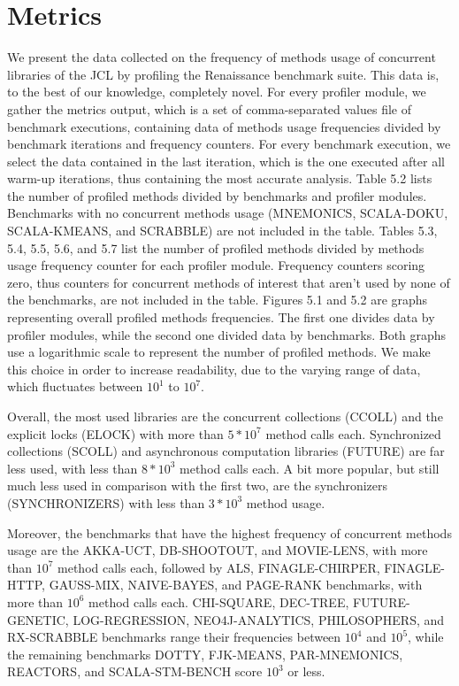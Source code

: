 \documentclass[]{usiinfthesis}
\begin{document}
\section{Metrics}
We present the data collected on the frequency of methods usage of concurrent libraries of the JCL by profiling the Renaissance benchmark suite. This data is, to the best of our knowledge, completely novel. For every profiler module, we gather the metrics output, which is a set of comma-separated values file of benchmark executions, containing data of methods usage frequencies divided by benchmark iterations and frequency counters. For every benchmark execution, we select the data contained in the last iteration, which is the one executed after all warm-up iterations, thus containing the most accurate analysis. Table 5.2 lists the number of profiled methods divided by benchmarks and profiler modules. Benchmarks with no concurrent methods usage (MNEMONICS, SCALA-DOKU, SCALA-KMEANS, and SCRABBLE) are not included in the table. Tables 5.3, 5.4, 5.5, 5.6, and 5.7 list the number of profiled methods divided by methods usage frequency counter for each profiler module. Frequency counters scoring zero, thus counters for concurrent methods of interest that aren't used by none of the benchmarks, are not included in the table. Figures 5.1 and 5.2 are graphs representing overall profiled methods frequencies. The first one divides data by profiler modules, while the second one divided data by benchmarks. Both graphs use a logarithmic scale to represent the number of profiled methods. We make this choice in order to increase readability, due to the varying range of data, which fluctuates between \(10^1\) to \(10^7\).

Overall, the most used libraries are the concurrent collections (CCOLL) and the explicit locks (ELOCK) with more than \(5*10^7\) method calls each. Synchronized collections (SCOLL) and asynchronous computation libraries (FUTURE) are far less used, with less than \(8*10^3\) method calls each. A bit more popular, but still much less used in comparison with the first two, are the synchronizers (SYNCHRONIZERS) with less than \(3*10^3\) method usage.

Moreover, the benchmarks that have the highest frequency of concurrent methods usage are the AKKA-UCT, DB-SHOOTOUT, and MOVIE-LENS, with more than \(10^7\) method calls each, followed by ALS, FINAGLE-CHIRPER, FINAGLE-HTTP, GAUSS-MIX, NAIVE-BAYES, and PAGE-RANK benchmarks, with more than \(10^6\) method calls each. CHI-SQUARE, DEC-TREE, FUTURE-GENETIC, LOG-REGRESSION, NEO4J-ANALYTICS, PHILOSOPHERS, and RX-SCRABBLE benchmarks range their frequencies between \(10^4\) and \(10^5\), while the remaining benchmarks DOTTY, FJK-MEANS, PAR-MNEMONICS, REACTORS, and SCALA-STM-BENCH score \(10^3\) or less. 
\end{document}
